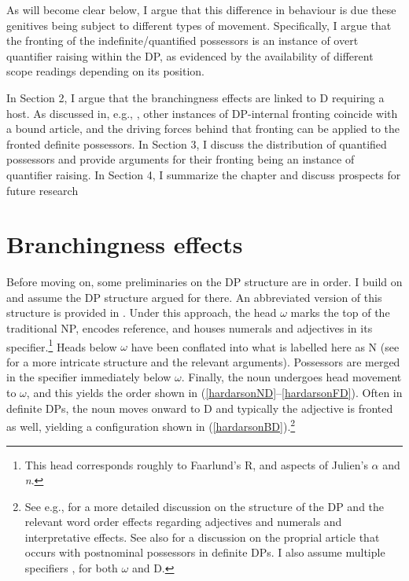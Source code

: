 \documentclass[output=paper,colorlinks,citecolor=brown,
]{langscibook}
\begin{document}
As will become clear below, I argue that this difference in behaviour is due these genitives being subject to different types of movement. Specifically, I argue that the fronting of the indefinite/quantified possessors is an instance of overt quantifier raising within the DP, as evidenced by the availability of different scope readings depending on its position.

In Section 2, I argue that the branchingness effects are linked to D requiring a host. As discussed in, e.g., \citet{Hardarson:2016wd}, other instances of DP-internal fronting coincide with a bound article, and the driving forces behind that fronting can be applied to the fronted definite possessors. In Section 3, I discuss the distribution of quantified possessors and provide arguments for their fronting being an instance of quantifier raising. In Section 4, I summarize the chapter and discuss prospects for future research

\section{Branchingness effects}
\label{hardarsonsec:branches}

Before moving on, some preliminaries on the DP structure are in order. I build on \citet{Hardarson:2016wd} and assume the DP structure argued for there. An abbreviated version of this structure is provided in . Under this approach, the head $\omega$ marks the top of the traditional NP, encodes reference, and houses numerals and adjectives in its specifier.\footnote{This head corresponds roughly to Faarlund's \citeyearpar{Faarlund:2004,Faarlund:2009tq} R, and aspects of Julien's \citeyearpar{Julien:2003wu,Julien:2005wh} $\alpha$ and \textit{n}.} Heads below $\omega$ have been conflated into what is labelled here as N (see \citealt{Hardarson:2016wd} for a more intricate structure and the relevant arguments). Possessors are merged in the specifier immediately below $\omega$. Finally, the noun undergoes head movement to $\omega$, and this yields the order shown in (\ref{hardarsonND}--\ref{hardarsonFD}). Often in definite DPs, the noun moves onward to D and typically the adjective is fronted as well, yielding a configuration shown in (\ref{hardarsonBD}).\footnote{See e.g., \citep{Magnusson:1984ue,HAS:1993,Sigurdsson:2006wn,Pfaff:2015tp,Ingason:2016wv,Hardarson:2016wd} for a more detailed discussion on the structure of the DP and the relevant word order effects regarding adjectives and numerals and interpretative effects. See also \citet{Sigurdsson:2006wn} for a discussion on the proprial article that occurs with postnominal possessors in definite DPs. I also assume multiple specifiers \citep[e.g.,][]{Chomsky:1995uq,Lahne:2009va}, for both $\omega$ and D.}
\end{document}
